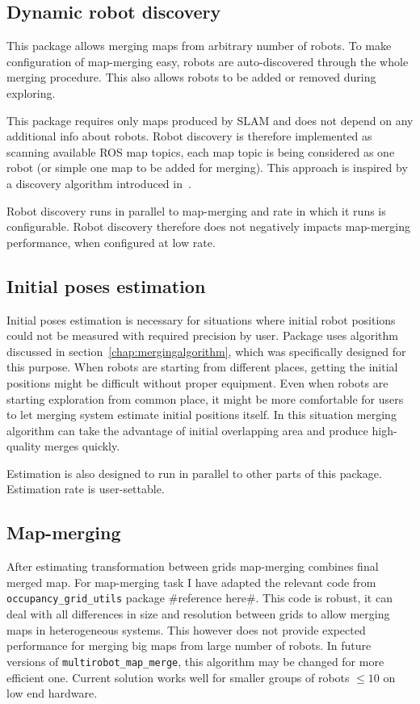 \subsection{Dynamic robot discovery}

This package allows merging maps from arbitrary number of robots. To make configuration of map-merging easy, robots are auto-discovered through the whole merging procedure. This also allows robots to be added or removed during exploring.

This package requires only maps produced by \gls{SLAM} and does not depend on any additional info about robots. Robot discovery is therefore implemented as scanning available \gls{ROS} map topics, each map topic is being considered as one robot (or simple one map to be added for merging). This approach is inspired by a discovery algorithm introduced in~\cite{Yan2014}.

Robot discovery runs in parallel to map-merging and rate in which it runs is configurable. Robot discovery therefore does not negatively impacts map-merging performance, when configured at low rate.

\subsection{Initial poses estimation}

Initial poses estimation is necessary for situations where initial robot positions could not be measured with required precision by user. Package uses algorithm discussed in section~\ref{chap:mergingalgorithm}, which was specifically designed for this purpose. When robots are starting from different places, getting the initial positions might be difficult without proper equipment. Even when robots are starting exploration from common place, it might be more comfortable for users to let merging system estimate initial positions itself. In this situation merging algorithm can take the advantage of initial overlapping area and produce high-quality merges quickly.

Estimation is also designed to run in parallel to other parts of this package. Estimation rate is user-settable.

\subsection{Map-merging}

After estimating transformation between grids map-merging combines final merged map. For map-merging task I have adapted the relevant code from \texttt{occupancy\_grid\_utils} package \#reference here\#. This code is robust, it can deal with all differences in size and resolution between grids to allow merging maps in heterogeneous systems. This however does not provide expected performance for merging big maps from large number of robots. In future versions of \texttt{multirobot\_map\_merge}, this algorithm may be changed for more efficient one.
Current solution works well for smaller groups of robots $\le 10$ on low end hardware.

